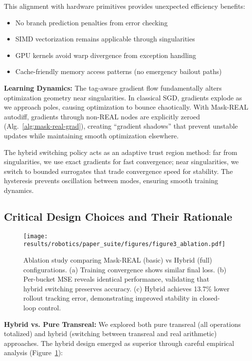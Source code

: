 \documentclass[twoside,11pt]{article}
\newcommand{\trReal}{\textsc{REAL}}
\newcommand{\TAGREAL}{\trReal}
\begin{document}
This alignment with hardware primitives provides unexpected efficiency benefits:
\begin{itemize}
\item No branch prediction penalties from error checking
\item SIMD vectorization remains applicable through singularities
\item GPU kernels avoid warp divergence from exception handling
\item Cache-friendly memory access patterns (no emergency bailout paths)
\end{itemize}

\textbf{Learning Dynamics:} The tag-aware gradient flow fundamentally alters optimization geometry near singularities. In classical SGD, gradients explode as we approach poles, causing optimization to bounce chaotically. With Mask-REAL autodiff, gradients through non-\TAGREAL{} nodes are explicitly zeroed (Alg.~\ref{alg:mask-real-grad}), creating ``gradient shadows'' that prevent unstable updates while maintaining smooth optimization elsewhere.

The hybrid switching policy acts as an adaptive trust region method: far from singularities, we use exact gradients for fast convergence; near singularities, we switch to bounded surrogates that trade convergence speed for stability. The hysteresis prevents oscillation between modes, ensuring smooth training dynamics.
\subsection{Critical Design Choices and Their Rationale}

\begin{figure}[t]
\centering
\texttt{[image: results/robotics/paper\_suite/figures/figure3\_ablation.pdf]}
\caption{Ablation study comparing Mask-REAL (basic) vs Hybrid (full) configurations. (a) Training convergence shows similar final loss. (b) Per-bucket MSE reveals identical performance, validating that hybrid switching preserves accuracy. (c) Hybrid achieves 13.7\% lower rollout tracking error, demonstrating improved stability in closed-loop control.}
\label{fig:ablation}
\end{figure}

\textbf{Hybrid vs. Pure Transreal:} We explored both pure transreal (all operations totalized) and hybrid (switching between transreal and real arithmetic) approaches. The hybrid design emerged as superior through careful empirical analysis (Figure~\ref{fig:ablation}):
\end{document}
